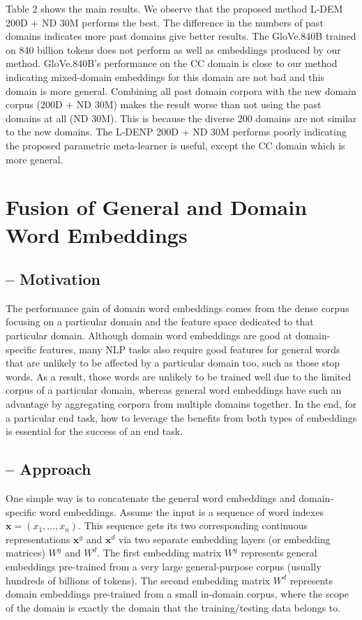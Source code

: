 Table 2 shows the main results. 
We observe that the proposed method L-DEM 200D + ND 30M performs the best.
The difference in the numbers of past domains indicates more past domains give better results.
The GloVe.840B trained on 840 billion tokens does not perform as well as embeddings produced by our method. 
GloVe.840B's performance on the CC domain is close to our method indicating mixed-domain embeddings for this domain are not bad and this domain is more general.  
Combining all past domain corpora with the new domain corpus (200D + ND 30M) makes the result worse than not using the past domains at all (ND 30M).
This is because the diverse 200 domains are not similar to the new domains.
The L-DENP 200D + ND 30M performs poorly indicating the proposed parametric meta-learner is useful, except the CC domain which is more general.

\section{Fusion of General and Domain Word Embeddings}

\subsection{-- Motivation}
The performance gain of domain word embeddings comes from the dense corpus focusing on a particular domain and the feature space dedicated to that particular domain. 
Although domain word embeddings are good at domain-specific features, many NLP tasks also require good features for general words that are unlikely to be affected by a particular domain too, such as those stop words.
As a result, those words are unlikely to be trained well due to the limited corpus of a particular domain, whereas general word embeddings have such an advantage by aggregating corpora from multiple domains together.
In the end, for a particular end task, how to leverage the benefits from both types of embeddings is essential for the success of an end task.  

\subsection{-- Approach}

One simple way is to concatenate the general word embeddings and domain-specific word embeddings.
Assume the input is a sequence of word indexes $\mathbf{x}=(x_1, \dots, x_n)$.
This sequence gets its two corresponding continuous representations $\mathbf{x}^g$ and $\mathbf{x}^d$ via two separate embedding layers (or embedding matrices) $W^g$ and $W^d$.
The first embedding matrix $W^g$ represents general embeddings pre-trained from a very large general-purpose corpus (usually hundreds of billions of tokens).
The second embedding matrix $W^d$ represents domain embeddings pre-trained from a small in-domain corpus, where the scope of the domain is exactly the domain that the training/testing data belongs to.

